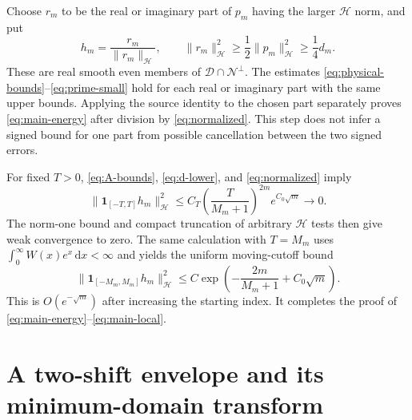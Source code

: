 \documentclass[11pt,a4paper]{article}
\newcommand{\HH}{\mathcal H}
\newcommand{\DD}{\mathcal D}
\newcommand{\NN}{\mathcal N}
\newcommand{\norm}[1]{\lVert #1\rVert}
\newcommand{\dd}{\,\mathrm d}
\theoremstyle{definition}
\theoremstyle{remark}
\numberwithin{equation}{section}
\begin{document}
Choose $r_m$ to be the real or imaginary part of $p_m$ having the larger
$\HH$ norm, and put
\begin{equation}\label{eq:normalized}
 h_m=\frac{r_m}{\norm{r_m}_{\HH}},\qquad
 \norm{r_m}_{\HH}^2\ge\frac12\norm{p_m}_{\HH}^2\ge\frac14d_m.
\end{equation}
These are real smooth even members of $\DD\cap\NN^\perp$.
The estimates \eqref{eq:physical-bounds}--\eqref{eq:prime-small} hold for
each real or imaginary part with the same upper bounds. Applying the
source identity to the chosen part separately proves
\eqref{eq:main-energy} after division by \eqref{eq:normalized}. This step
does not infer a signed bound for one part from possible cancellation
between the two signed errors.

For fixed $T>0$, \eqref{eq:A-bounds}, \eqref{eq:d-lower}, and
\eqref{eq:normalized} imply
\begin{equation}\label{eq:local-explicit}
 \norm{\mathbf1_{[-T,T]}h_m}_{\HH}^2
 \le C_T\left(\frac{T}{M_m+1}\right)^{2m}e^{C_0\sqrt m}\longrightarrow0.
\end{equation}
The norm-one bound and compact truncation of arbitrary $\HH$ tests then
give weak convergence to zero. The same calculation with $T=M_m$ uses
$\int_0^\infty W(x)e^x\dd x<\infty$ and yields the uniform moving-cutoff
bound
\begin{equation}\label{eq:moving-cutoff}
 \norm{\mathbf1_{[-M_m,M_m]}h_m}_{\HH}^2
 \le C\exp\left(-\frac{2m}{M_m+1}+C_0\sqrt m\right).
\end{equation}
This is $O(e^{-\sqrt m})$ after increasing the starting index.
It completes the proof of \eqref{eq:main-energy}--\eqref{eq:main-local}.

\section{A two-shift envelope and its minimum-domain transform}\label{sec:envelope}
\end{document}
